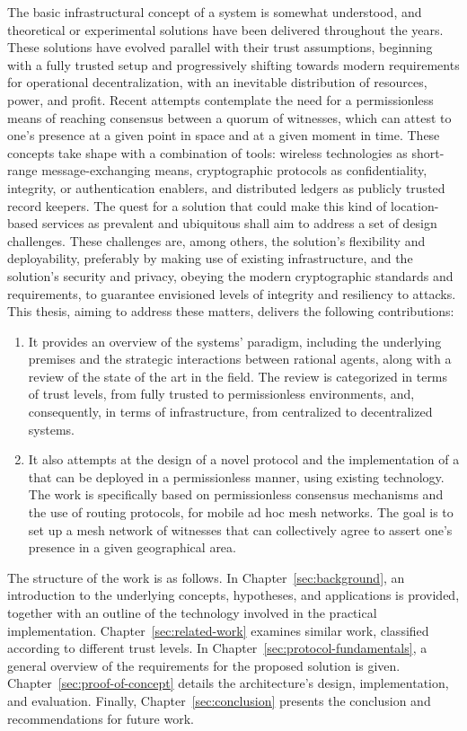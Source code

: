 The basic infrastructural concept of a \pol{} system is somewhat understood, and theoretical or experimental solutions have been delivered throughout the years. These solutions have evolved parallel with their trust assumptions, beginning with a fully trusted setup and progressively shifting towards modern requirements for operational decentralization, with an inevitable distribution of resources, power, and profit. Recent attempts contemplate the need for a permissionless means of reaching consensus between a quorum of witnesses, which can attest to one's presence at a given point in space and at a given moment in time. These concepts take shape with a combination of tools: wireless technologies as short-range message-exchanging means, cryptographic protocols as confidentiality, integrity, or authentication enablers, and distributed ledgers as publicly trusted record keepers. The quest for a solution that could make this kind of location-based services as prevalent and ubiquitous shall aim to address a set of design challenges. These challenges are, among others, the solution's flexibility and deployability, preferably by making use of existing infrastructure, and the solution's security and privacy, obeying the modern cryptographic standards and requirements, to guarantee envisioned levels of integrity and resiliency to attacks. This thesis, aiming to address these matters, delivers the following contributions:
\begin{enumerate}
\item It provides an overview of the \pol{} systems' paradigm, including the underlying premises and the strategic interactions between rational agents, along with a review of the state of the art in the field. The review is categorized in terms of trust levels, from fully trusted to permissionless environments, and, consequently, in terms of infrastructure, from centralized to decentralized systems.
\item It also attempts at the design of a novel \pol{} protocol and the implementation of a \poc{} that can be deployed in a permissionless manner, using existing technology. The work is specifically based on permissionless consensus mechanisms and the use of routing protocols, for mobile ad hoc mesh networks. The goal is to set up a mesh network of witnesses that can collectively agree to assert one's presence in a given geographical area.
\end{enumerate}

The structure of the work is as follows. In Chapter~\ref{sec:background}, an introduction to the underlying concepts, hypotheses, and applications is provided, together with an outline of the technology involved in the practical implementation. Chapter~\ref{sec:related-work} examines similar work, classified according to different trust levels. In Chapter~\ref{sec:protocol-fundamentals}, a general overview of the requirements for the proposed solution is given. Chapter~\ref{sec:proof-of-concept} details the architecture's design, implementation, and evaluation. Finally, Chapter~\ref{sec:conclusion} presents the conclusion and recommendations for future work.
